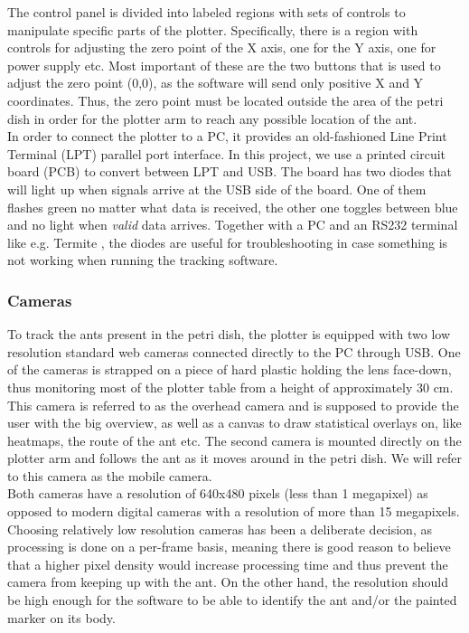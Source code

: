 The control panel is divided into labeled regions with sets of controls to manipulate specific parts of the plotter. Specifically, there is a region with controls for adjusting the zero point of the X axis, one for the Y axis, one for power supply etc. Most important of these are the two buttons that is used to adjust the zero point (0,0), as the software will send only positive X and Y coordinates. Thus, the zero point must be located outside the area of the petri dish in order for the plotter arm to reach any possible location of the ant. \\

In order to connect the plotter to a PC, it provides an old-fashioned Line Print Terminal (LPT) parallel port interface. In this project, we use a printed circuit board (PCB) to convert between LPT and USB. The board has two diodes that will light up when signals arrive at the USB side of the board. One of them flashes green no matter what data is received, the other one toggles between blue and no light when \textit{valid} data arrives. Together with a PC and an RS232 terminal like e.g. Termite \cite{termite}, the diodes are useful for troubleshooting in case something is not working when running the tracking software. \\ 

\subsubsection{Cameras} \mbox{} \par
To track the ants present in the petri dish, the plotter is equipped with two low resolution standard web cameras connected directly to the PC through USB. One of the cameras is strapped on a piece of hard plastic holding the lens face-down, thus monitoring most of the plotter table from a height of approximately 30 cm. This camera is referred to as the overhead camera and is supposed to provide the user with the big overview, as well as a canvas to draw statistical overlays on, like heatmaps, the route of the ant etc. The second camera is mounted directly on the plotter arm and follows the ant as it moves around in the petri dish. We will refer to this camera as the mobile camera. \\

Both cameras have a resolution of 640x480 pixels (less than 1 megapixel) as opposed to modern digital cameras with a resolution of more than 15 megapixels. Choosing relatively low resolution cameras has been a deliberate decision, as processing is done on a per-frame basis, meaning there is good reason to believe that a higher pixel density would increase processing time and thus prevent the camera from keeping up with the ant. On the other hand, the resolution should be high enough for the software to be able to identify the ant and/or the painted marker on its body. \\

